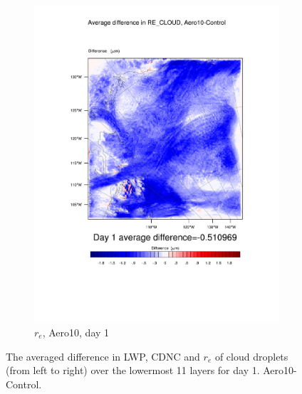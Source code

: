 \begin{figure}[h]
\begin{subfigure}{0.30\textwidth}
		\includegraphics[width=\textwidth]{results/aero10/diff_Aero10_RE_CLOUD_Day1.pdf}
		\caption{$r_e$, Aero10, day 1}
		\label{subfig:recloud_r3Day1}
	\end{subfigure}
\caption{The averaged difference in LWP, CDNC and $r_e$ of cloud droplets (from left to right) over the lowermost 11 layers for day 1. Aero10-Control.}
\label{fig:lwpcdncre_r3Day1}
\end{figure}

